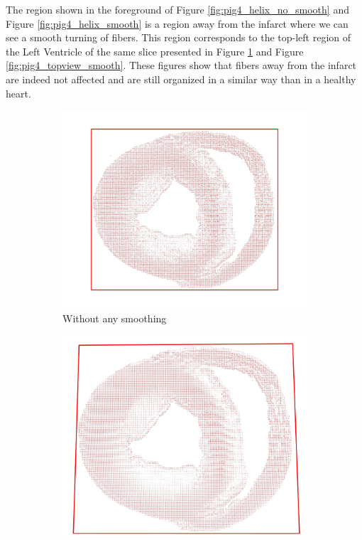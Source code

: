 The region shown in the foreground of Figure \ref{fig:pig4_helix_no_smooth} and Figure \ref{fig:pig4_helix_smooth} is a region away from the infarct where we can see a smooth turning of fibers. This region corresponds to the top-left region of the Left Ventricle of the same slice presented in Figure \ref{fig:pig4_topview_no_smooth} and Figure \ref{fig:pig4_topview_smooth}. These figures show that fibers away from the infarct are indeed not affected and are still organized in a similar way than in a healthy heart.

\begin{figure}[!h]
    \centering
    \begin{subfigure}{.48\textwidth}
        \includegraphics[width=\textwidth]{figures/pig4_topview_no_smooth}
        \caption{Without any smoothing}
        \label{fig:pig4_topview_no_smooth}
    \end{subfigure}
    \begin{subfigure}{.48\textwidth}
        \includegraphics[width=\textwidth]{figures/pig4_topview_smooth}

\end{subfigure}
\end{figure}
